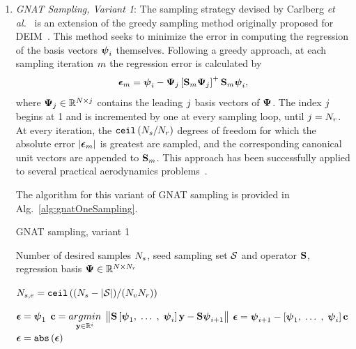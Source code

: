 \begin{enumerate}
	\item \textit{GNAT Sampling, Variant 1}: The sampling strategy devised by Carlberg \textit{et al.}~\cite{Carlberg2013} is an extension of the greedy sampling method originally proposed for DEIM~\cite{Chaturantabut2010}. This method seeks to minimize the error in computing the regression of the basis vectors $\boldsymbol{\psi}_{i}$ themselves. Following a greedy approach, at each sampling iteration $m$ the regression error is calculated by
	\begin{equation}\label{eq:gnatMetric}
		\errVec_{\greedyIdx} = \deimBasisVec_{\dummyIdx} - \deimBasis_{\dummyIdxTwo} \left[ \sampMat_{\greedyIdx} \deimBasis_{\dummyIdxTwo} \right]^+ \sampMat_{\greedyIdx}\deimBasisVec_{\dummyIdx},
	\end{equation}
    where $\deimBasis_{\dummyIdxTwo} \inRTwo{\numDOF}{\dummyIdxTwo}$ contains the leading $j$ basis vectors of $\deimBasis$. The index $j$ begins at 1 and is incremented by one at every sampling loop, until $j = N_r$. At every iteration, the $\text{\texttt{ceil}}\left(N_s / N_r\right)$ degrees of freedom for which the absolute error $|\boldsymbol{\epsilon}_{m}|$ is greatest are sampled, and the corresponding canonical unit vectors are appended to $\mathbf{S}_{m}$. This approach has been successfully applied to several practical aerodynamics problems~\cite{Carlberg2013,Carlberg2017}.

	The algorithm for this variant of GNAT sampling is provided in Alg.~\ref{alg:gnatOneSampling}.

	\begin{algorithm}
		\caption{GNAT sampling, variant 1}\label{alg:gnatOneSampling}
		\begin{algorithmic}
			\REQUIRE Number of desired samples $N_s$, seed sampling set $\mathcal{S}$ and operator $\mathbf{S}$, regression basis $\deimBasis \inRTwo{\numDOF}{\numResModes}$   
			
			\STATE $N_{s,e} = \mathtt{ceil} \left((N_s - \vert\mathcal{S}\vert) / (N_{v}N_r)\right)$ 
			
	
					\STATE $\boldsymbol{\epsilon} = \boldsymbol{\psi}_1$
				\ELSE
					\STATE $\mathbf{c} = \underset{\mathbf{y} \in \mathbb{R}^{i}}{argmin} \; \left\lVert\mathbf{S} \left[\boldsymbol{\psi}_1, \; \hdots \;, \; \boldsymbol{\psi}_{i} \right] \mathbf{y} - \mathbf{S} \boldsymbol{\psi}_{i+1}\right\rVert$
					\STATE $\boldsymbol{\epsilon} = \boldsymbol{\psi}_{i+1} - \left[\boldsymbol{\psi}_1, \; \hdots \;, \; \boldsymbol{\psi}_{i} \right] \mathbf{c}$
				\ENDIF
				\STATE $\boldsymbol{\epsilon} = \mathtt{abs}\left(\boldsymbol{\epsilon}\right)$
				

\end{algorithmic}
\end{algorithm}
\end{enumerate}
